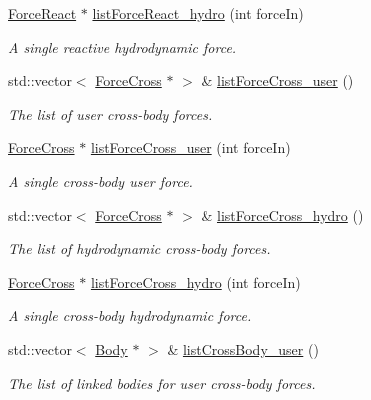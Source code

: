 \begin{DoxyCompactItemize}
\hyperlink{classosea_1_1ofreq_1_1_force_react}{Force\-React} $\ast$ \hyperlink{classosea_1_1ofreq_1_1_body_a774fe4681465ee5a8ea344f4ec7c18e2}{list\-Force\-React\-\_\-hydro} (int force\-In)
\begin{DoxyCompactList}\small\item\em A single reactive hydrodynamic force. \end{DoxyCompactList}\item 
std\-::vector$<$ \hyperlink{classosea_1_1ofreq_1_1_force_cross}{Force\-Cross} $\ast$ $>$ \& \hyperlink{classosea_1_1ofreq_1_1_body_ac428c19730346a51bde800e0cbc2e281}{list\-Force\-Cross\-\_\-user} ()
\begin{DoxyCompactList}\small\item\em The list of user cross-\/body forces. \end{DoxyCompactList}\item 
\hyperlink{classosea_1_1ofreq_1_1_force_cross}{Force\-Cross} $\ast$ \hyperlink{classosea_1_1ofreq_1_1_body_af01cd5dc37ebd7969f4f2bc10ba3d76b}{list\-Force\-Cross\-\_\-user} (int force\-In)
\begin{DoxyCompactList}\small\item\em A single cross-\/body user force. \end{DoxyCompactList}\item 
std\-::vector$<$ \hyperlink{classosea_1_1ofreq_1_1_force_cross}{Force\-Cross} $\ast$ $>$ \& \hyperlink{classosea_1_1ofreq_1_1_body_a0dc70d3a67ad921a022f48a2fdf37526}{list\-Force\-Cross\-\_\-hydro} ()
\begin{DoxyCompactList}\small\item\em The list of hydrodynamic cross-\/body forces. \end{DoxyCompactList}\item 
\hyperlink{classosea_1_1ofreq_1_1_force_cross}{Force\-Cross} $\ast$ \hyperlink{classosea_1_1ofreq_1_1_body_ab814600b31abd49c0a8de29a0fb597b4}{list\-Force\-Cross\-\_\-hydro} (int force\-In)
\begin{DoxyCompactList}\small\item\em A single cross-\/body hydrodynamic force. \end{DoxyCompactList}\item 
std\-::vector$<$ \hyperlink{classosea_1_1ofreq_1_1_body}{Body} $\ast$ $>$ \& \hyperlink{classosea_1_1ofreq_1_1_body_a56ad2b60555f24df3feb5889974b27b2}{list\-Cross\-Body\-\_\-user} ()
\begin{DoxyCompactList}\small\item\em The list of linked bodies for user cross-\/body forces. \end{DoxyCompactList}\item 

\end{DoxyCompactItemize}
